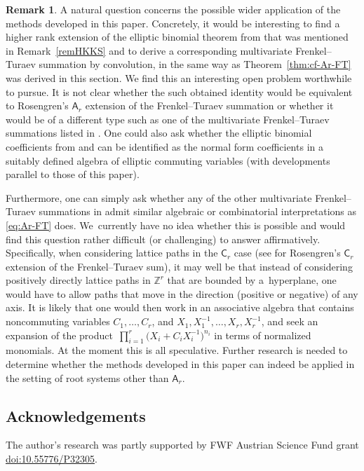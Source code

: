 \documentclass[pdftex]{sigma}
\numberwithin{equation}{section}
\theoremstyle{definition}
\newtheorem{Remark}[Theorem]{Remark}
\newcommand{\Z}{\mathbb Z}
\begin{document}
\begin{Remark}
 A natural question concerns the possible wider application of the
 methods developed in this paper.
Concretely, it would be interesting to find a higher rank extension of
 the elliptic binomial theorem from
 \cite[Definition~5.6 and Theorem~5.7]{HKKS} that was mentioned
 in Remark~\ref{remHKKS} and to derive a corresponding
 multivariate Frenkel--Turaev summation by convolution, in the same
 way as Theorem~\ref{thm:cf-Ar-FT} was derived in this section.
 We find this an interesting open problem worthwhile to pursue.
 It is not clear whether the such obtained identity would be equivalent
 to Rosengren's $\mathsf A_r$ extension of the Frenkel--Turaev
 summation or whether
 it would be of a different type such as one of the multivariate
 Frenkel--Turaev summations listed in \cite{RW}.
 One could also ask whether the elliptic binomial coefficients from
 \cite{CG} and \cite{R06} can be identified as the normal form coefficients
 in a suitably defined algebra of elliptic commuting variables
 (with developments parallel to those of this paper).

Furthermore, one can simply ask whether any of the other
 multivariate Frenkel--Turaev summations in \cite{RW} admit similar
 algebraic or combinatorial interpretations as \eqref{eq:Ar-FT} does.
 We~currently have no idea whether this is possible and would find
 this question rather difficult (or challenging) to answer affirmatively.
 Specifically, when considering lattice paths in the $\mathsf C_r$ case
 (see \cite[Theorem~7.1]{R04} for Rosengren's $\mathsf C_r$ extension of
 the Frenkel--Turaev sum), it may well be that instead of
 considering positively directly lattice paths in $\Z^r$ that are bounded
 by a~hyperplane, one would have to allow paths that
 move in the direction (positive or negative) of any axis.
It is likely that one would then work in an associative
algebra that contains noncommuting variables
$C_1,\dots,C_r$, and $X_1,X_1^{-1},\dots,X_r,X_r^{-1}$,
and seek an expansion of the product~${\prod_{i=1}^r\bigl(X_i+C_iX_i^{-1}\bigr)^{n_i}}$ in terms of normalized monomials.
 At the moment this is all speculative.
 Further research is needed to determine whether the methods
 developed in this paper can indeed be applied in the setting
 of root systems other than $\mathsf{A}_r$.
\end{Remark}

\subsection*{Acknowledgements}
The author's research was partly supported by
FWF Austrian Science Fund grant
 \href{https://doi.org/10.55776/P32305}{doi:10.55776/\allowbreak P32305}.
\end{document}
